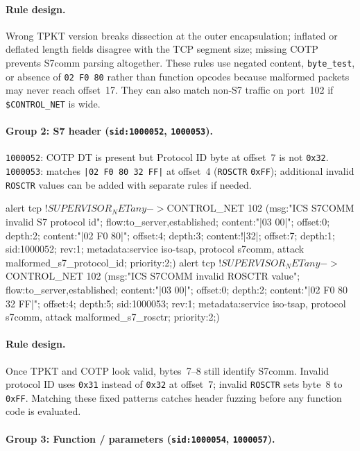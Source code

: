 \documentclass[../main.tex]{subfiles}
\begin{document}
\paragraph{Rule design.}
Wrong TPKT version breaks dissection at the outer encapsulation; inflated or deflated length fields disagree with the TCP segment size; missing COTP prevents S7comm parsing altogether. These rules use negated content, \texttt{byte\_test}, or absence of \texttt{02 F0 80} rather than function opcodes because malformed packets may never reach offset~17. They can also match non-S7 traffic on port~102 if \texttt{\$CONTROL\_NET} is wide.

\paragraph{Group 2: S7 header (\texttt{sid:1000052}, \texttt{1000053}).}

\texttt{1000052}: COTP DT is present but Protocol ID byte at offset~7 is not \texttt{0x32}. \texttt{1000053}: matches \texttt{|02 F0 80 32 FF|} at offset~4 (\texttt{ROSCTR} \texttt{0xFF}); additional invalid \texttt{ROSCTR} values can be added with separate rules if needed.

\begin{packetdump}
alert tcp !$SUPERVISOR_NET any -> $CONTROL_NET 102 (msg:"ICS S7COMM invalid S7 protocol id";
  flow:to_server,established; content:"|03 00|"; offset:0; depth:2;
  content:"|02 F0 80|"; offset:4; depth:3; content:!|32|; offset:7; depth:1;
  sid:1000052; rev:1; metadata:service iso-tsap, protocol s7comm,
  attack malformed_s7_protocol_id; priority:2;)
alert tcp !$SUPERVISOR_NET any -> $CONTROL_NET 102 (msg:"ICS S7COMM invalid ROSCTR value";
  flow:to_server,established; content:"|03 00|"; offset:0; depth:2;
  content:"|02 F0 80 32 FF|"; offset:4; depth:5; sid:1000053; rev:1;
  metadata:service iso-tsap, protocol s7comm, attack malformed_s7_rosctr;
  priority:2;)
\end{packetdump}

\paragraph{Rule design.}
Once TPKT and COTP look valid, bytes~7--8 still identify S7comm. Invalid protocol ID uses \texttt{0x31} instead of \texttt{0x32} at offset~7; invalid \texttt{ROSCTR} sets byte~8 to \texttt{0xFF}. Matching these fixed patterns catches header fuzzing before any function code is evaluated.

\paragraph{Group 3: Function / parameters (\texttt{sid:1000054}, \texttt{1000057}).}
\end{document}
